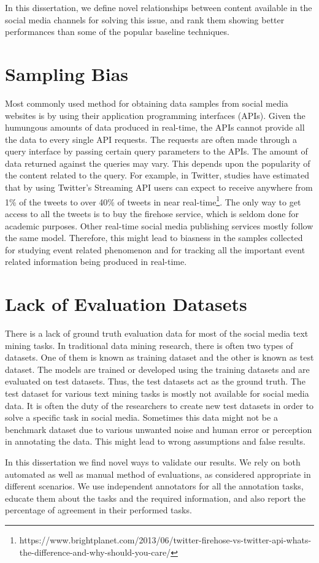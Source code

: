 In this dissertation, we define novel relationships between content available in the social media channels for solving this issue, and rank them showing better performances than some of the popular baseline techniques.   


\section{Sampling Bias}
Most commonly used method for obtaining data samples from social media websites is by using their application programming interfaces (APIs). Given the humungous amounts of data produced in real-time, the APIs cannot provide all the data to every single API requests. The requests are often made through a query interface by passing certain query parameters to the APIs. The amount of data returned against the queries may vary. This depends upon the popularity of the content related to the query. For example, in Twitter, studies have estimated that by using Twitter's Streaming API users can expect to receive anywhere from 1\% of the tweets to over 40\% of tweets in near real-time\footnote{https://www.brightplanet.com/2013/06/twitter-firehose-vs-twitter-api-whats-the-difference-and-why-should-you-care/}. The only way to get access to all the tweets is to buy the firehose service, which is seldom done for academic purposes. Other real-time social media publishing services mostly follow the same model. Therefore, this might lead to biasness in the samples collected for studying event related phenomenon and for tracking all the important event related information being produced in real-time.


\section{Lack of Evaluation Datasets}
There is a lack of ground truth evaluation data for most of the social media text mining tasks. In traditional data mining research, there is often two types of datasets. One of them is known as training dataset and the other is known as test dataset. The models are trained or developed using the training datasets and are evaluated on test datasets. Thus, the test datasets act as the ground truth. The test dataset for various text mining tasks is mostly not available for social media data. It is often the duty of the researchers to create new test datasets in order to solve a specific task in social media. Sometimes this data might not be a benchmark dataset due to various unwanted noise and human error or perception in annotating the data. This might lead to wrong assumptions and false results.

In this dissertation we find novel ways to validate our results. We rely on both automated as well as manual method of evaluations, as considered appropriate in different scenarios. We use independent annotators for all the annotation tasks, educate them about the tasks and the required information, and also report the percentage of agreement in their performed tasks.
